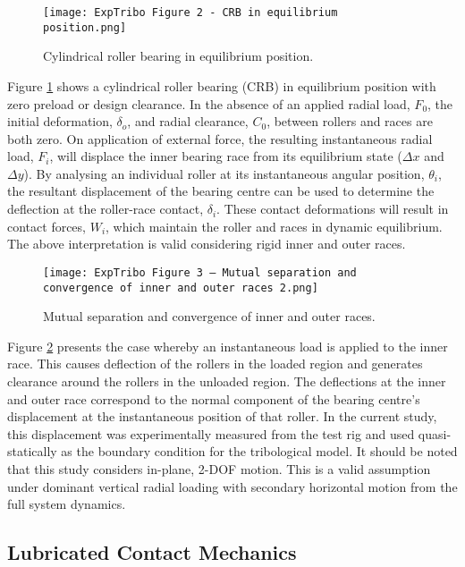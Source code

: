 \begin{figure}
	\centering
	\texttt{[image: ExpTribo Figure 2 - CRB in equilibrium position.png]}
	\caption{Cylindrical roller bearing in equilibrium position.}
	\label{CRB in equilibrium position}
\end{figure}

Figure \ref{CRB in equilibrium position} shows a cylindrical roller bearing (CRB) in equilibrium position with zero preload or design clearance. In the absence of an applied radial load, $F_0$, the initial deformation, $\delta_o$, and radial clearance, $C_0$, between rollers and races are both zero. On application of external force, the resulting instantaneous radial load, $F_i$, will displace the inner bearing race from its equilibrium state ($\Delta x$ and $\Delta y$). By analysing an individual roller at its instantaneous angular position, $\theta_i$, the resultant displacement of the bearing centre can be used to determine the deflection at the roller-race contact, $\delta_i$. These contact deformations will result in contact forces, $W_i$, which maintain the roller and races in dynamic equilibrium. The above interpretation is valid considering rigid inner and outer races.

\begin{figure}
	\centering
	\texttt{[image: ExpTribo Figure 3 – Mutual separation and convergence of inner and outer races 2.png]}
	\caption{Mutual separation and convergence of inner and outer races.}
	\label{Mutual separation and convergence of inner and outer races}
\end{figure}

Figure \ref{Mutual separation and convergence of inner and outer races} presents the case whereby an instantaneous load is applied to the inner race. This causes deflection of the rollers in the loaded region and generates clearance around the rollers in the unloaded region. The deflections at the inner and outer race correspond to the normal component of the bearing centre's displacement at the instantaneous position of that roller. In the current study, this displacement was experimentally measured from the test rig and used quasi-statically as the boundary condition for the tribological model. It should be noted that this study considers in-plane, 2-DOF motion. This is a valid assumption under dominant vertical radial loading with secondary horizontal motion from the full system dynamics.

\subsection{Lubricated Contact Mechanics}

